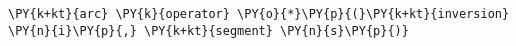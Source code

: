 \begin{Verbatim}[commandchars=\\\{\}]
    \PY{k+kt}{arc} \PY{k}{operator} \PY{o}{*}\PY{p}{(}\PY{k+kt}{inversion} \PY{n}{i}\PY{p}{,} \PY{k+kt}{segment} \PY{n}{s}\PY{p}{)}
\end{Verbatim}
